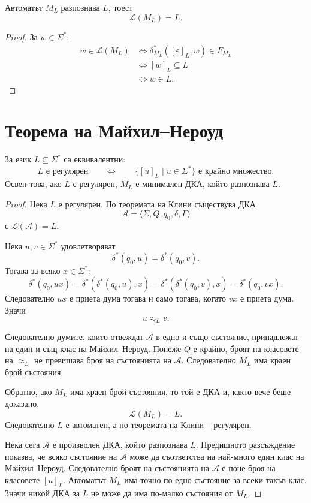 \begin{prop}
Автоматът $M_L$ разпознава $L$, тоест
\[
\mathcal L(M_L)=L.
\]
\end{prop}

\begin{proof}
За $w\in\Sigma^*$:
\[
\begin{aligned}
w\in\mathcal L(M_L)
&\Longleftrightarrow
\delta_{M_L}^*([\varepsilon]_L,w)\in F_{M_L}\\
&\Longleftrightarrow
[w]_L\subseteq L\\
&\Longleftrightarrow
w\in L.
\end{aligned}
\]
\end{proof}

\section{Теорема на Майхил--Нероуд}\label{s:4.7}

\begin{keythm}
За език $L\subseteq\Sigma^*$ са еквивалентни:
\[
L\text{ е регулярен}
\qquad\Longleftrightarrow\qquad
\{[u]_L\mid u\in\Sigma^*\}\text{ е крайно множество}.
\]
Освен това, ако $L$ е регулярен, $M_L$ е минимален ДКА, който разпознава $L$.
\end{keythm}

\begin{proof}
Нека $L$ е регулярен. По теоремата на Клини съществува ДКА
\[
\mathcal A=\langle\Sigma,Q,q_0,\delta,F\rangle
\]
с $\mathcal L(\mathcal A)=L$.

Нека $u,v\in\Sigma^*$ удовлетворяват
\[
\delta^*(q_0,u)=\delta^*(q_0,v).
\]
Тогава за всяко $x\in\Sigma^*$:
\[
\delta^*(q_0,ux)
=
\delta^*(\delta^*(q_0,u),x)
=
\delta^*(\delta^*(q_0,v),x)
=
\delta^*(q_0,vx).
\]
Следователно $ux$ е приета дума тогава и само тогава, когато $vx$ е приета дума. Значи
\[
u\approx_L v.
\]

Следователно думите, които отвеждат $\mathcal A$ в едно и също състояние, принадлежат на един и същ клас на Майхил--Нероуд. Понеже $Q$ е крайно, броят на класовете на $\approx_L$ не превишава броя на състоянията на $\mathcal A$. Следователно $M_L$ има краен брой състояния.

Обратно, ако $M_L$ има краен брой състояния, то той е ДКА и, както вече беше доказано,
\[
\mathcal L(M_L)=L.
\]
Следователно $L$ е автоматен, а по теоремата на Клини -- регулярен.

Нека сега $\mathcal A$ е произволен ДКА, който разпознава $L$. Предишното разсъждение показва, че всяко състояние на $\mathcal A$ може да съответства на най-много един клас на Майхил--Нероуд. Следователно броят на състоянията на $\mathcal A$ е поне броя на класовете $[u]_L$. Автоматът $M_L$ има точно по едно състояние за всеки такъв клас. Значи никой ДКА за $L$ не може да има по-малко състояния от $M_L$.
\end{proof}

